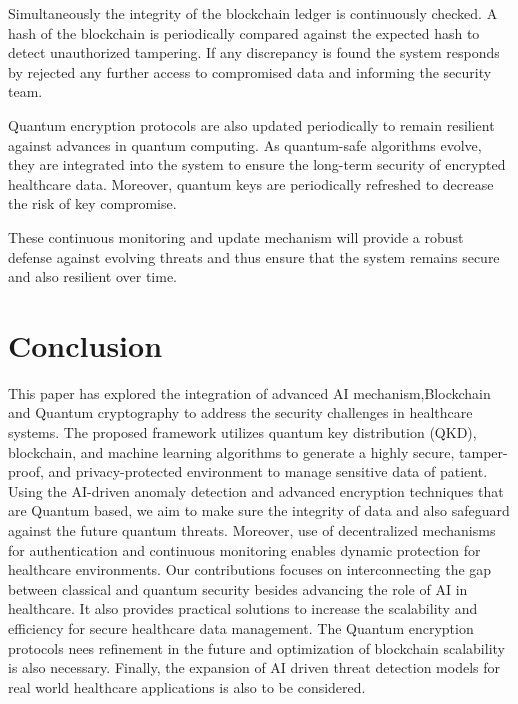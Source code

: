 \documentclass[pdflatex,sn-mathphys-num]{sn-jnl}%
\theoremstyle{thmstyleone}%
\theoremstyle{thmstyletwo}%
\theoremstyle{thmstylethree}%
\begin{document}
Simultaneously the integrity of the blockchain ledger is continuously checked. A hash of the blockchain is periodically compared against the expected hash to detect unauthorized tampering. If any discrepancy is found the system responds by rejected any further access to compromised data and informing the security team\cite{bib16}.

Quantum encryption protocols are also updated periodically to remain resilient against advances in quantum computing. As quantum-safe algorithms evolve, they are integrated into the system to ensure the long-term security of encrypted healthcare data. Moreover, quantum keys are periodically refreshed to decrease the risk of key compromise.

These continuous monitoring and update mechanism will provide a robust defense against evolving threats and thus ensure that the system remains secure and also resilient over time.










\section{Conclusion}
This paper has explored the integration of advanced AI mechanism,Blockchain and Quantum cryptography to address the security challenges in healthcare systems. The proposed framework utilizes quantum key distribution (QKD), blockchain, and machine learning algorithms to generate a highly secure, tamper-proof, and privacy-protected environment to manage sensitive data of patient. Using the AI-driven anomaly detection and advanced encryption techniques that are Quantum based, we aim to make sure the integrity of data and also safeguard against the future quantum threats. Moreover, use of decentralized mechanisms for authentication and continuous monitoring enables dynamic protection for healthcare environments. Our contributions focuses on interconnecting the gap between classical and quantum security besides advancing the role of AI in healthcare. It also provides practical solutions to increase the scalability and efficiency for secure healthcare data management. The Quantum encryption protocols nees refinement in the future and optimization of blockchain scalability is also necessary. Finally, the expansion of AI driven threat detection models for real world healthcare applications is also to be considered.










\end{document}
